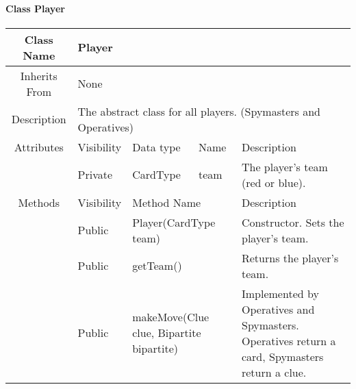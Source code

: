 \paragraph{Class Player}\mbox{}
\begin{tabularx}{\textwidth}{|c||l|l|l|X|}
    \hline
    \cellcolor{lightgray}Class Name & \multicolumn{4}{X|}{Player}\\
    \hline
    \cellcolor{lightgray}Inherits From & \multicolumn{4}{X|}{None}\\
    \hline
    \cellcolor{lightgray}Description & \multicolumn{4}{p{12cm}|}{The abstract class for all players. (Spymasters and Operatives)}\\
    \hline\hline
    
    \cellcolor{lightgray}Attributes & \cellcolor{lightgray}Visibility & \cellcolor{lightgray}Data type & \cellcolor{lightgray}Name & \cellcolor{lightgray}Description\\\cline{2-5}
    \cellcolor{lightgray} & Private & CardType & team & The player's team (red or blue).\\ 
    \hline\hline
    
    \cellcolor{lightgray}Methods & \cellcolor{lightgray}Visibility & \multicolumn{2}{l|}{\cellcolor{lightgray}Method Name} & \cellcolor{lightgray}Description\\\cline{2-5}
    \hline
    \cellcolor{lightgray} & Public & \multicolumn{2}{l|}{Player(CardType team)} & Constructor. Sets the player's team.\\
    \hline
    \cellcolor{lightgray} & Public & \multicolumn{2}{l|}{getTeam()} & Returns the player's team.\\
    \hline
    \cellcolor{lightgray} & Public & \multicolumn{2}{l|}{makeMove(Clue clue, Bipartite bipartite)} & Implemented by Operatives and Spymasters. Operatives return a card, Spymasters return a clue.\\
    \hline
\end{tabularx}